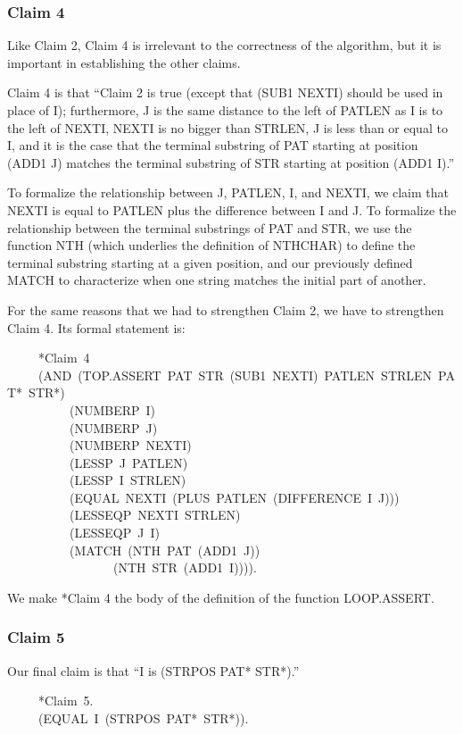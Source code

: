 \documentclass[11pt]{book}
\newenvironment{pubasis}{\begin{flushleft}\ttfamily\small}{\normalsize\rmfamily\end{flushleft}}
\newcommand{\pubdefaulttextsize}{\large}
\begin{document}
\subsubsection{Claim 4}
\pubdefaulttextsize
Like Claim 2, Claim 4 is irrelevant to the correctness of the algorithm,
but it is important in establishing the other claims.

Claim 4 is that ``Claim 2 is true (except that (SUB1 NEXTI) should be used in place of I); furthermore, J is the same distance to
the left of PATLEN as I is to the left of NEXTI, NEXTI is no bigger
than STRLEN, J is less than or equal to I, and it is the case that
the terminal substring of PAT starting at position (ADD1 J) matches
the terminal substring of STR starting at position (ADD1 I).''

To formalize the relationship between J, PATLEN, I, and NEXTI, we 
claim that NEXTI is equal to PATLEN plus the difference between
I and J.  To formalize the relationship between the terminal substrings
of PAT and STR, we  use the function NTH (which underlies the definition of NTHCHAR) to define the terminal
substring starting at a given position, and our previously defined MATCH
to characterize when one string matches the initial part of
another.

For the same reasons that we had to strengthen Claim 2, we have to
strengthen Claim 4.  Its formal statement is:
\begin{pubasis}
~~~~~*Claim~4\\
~~~~~(AND~(TOP.ASSERT~PAT~STR~(SUB1~NEXTI)~PATLEN~STRLEN~PAT*~STR*)\\
~~~~~~~~~~(NUMBERP~I)\\
~~~~~~~~~~(NUMBERP~J)\\
~~~~~~~~~~(NUMBERP~NEXTI)\\
~~~~~~~~~~(LESSP~J~PATLEN)\\
~~~~~~~~~~(LESSP~I~STRLEN)\\
~~~~~~~~~~(EQUAL~NEXTI~(PLUS~PATLEN~(DIFFERENCE~I~J)))\\
~~~~~~~~~~(LESSEQP~NEXTI~STRLEN)\\
~~~~~~~~~~(LESSEQP~J~I)\\
~~~~~~~~~~(MATCH~(NTH~PAT~(ADD1~J))\\
~~~~~~~~~~~~~~~~~(NTH~STR~(ADD1~I)))).\\
\end{pubasis}
We  make *Claim 4 the body of the definition of the function LOOP.ASSERT.
\subsubsection{Claim 5}
\pubdefaulttextsize
Our final claim is that ``I is (STRPOS PAT* STR*).''
\begin{pubasis}
~~~~~*Claim~5.\\
~~~~~(EQUAL~I~(STRPOS~PAT*~STR*)).\\
\end{pubasis}
\end{document}
